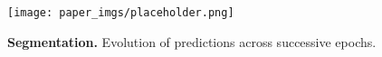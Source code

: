 \begin{figure}[h]
\centering
\texttt{[image: paper\_imgs/placeholder.png]}
\caption{\textbf{Segmentation.} Evolution of predictions across successive epochs.} \label{f:progresion_seg}
\end{figure}